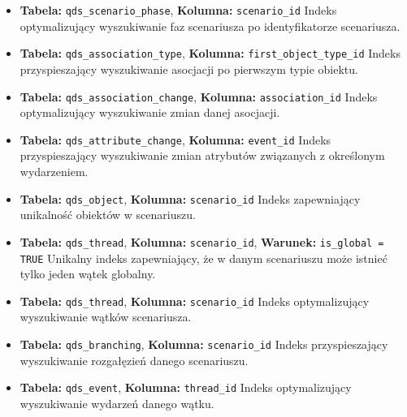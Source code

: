 \begin{itemize}
    \item \textbf{Tabela:} \texttt{qds\_scenario\_phase}, \textbf{Kolumna:} \texttt{scenario\_id}  
    Indeks optymalizujący wyszukiwanie faz scenariusza po identyfikatorze scenariusza.

    \item \textbf{Tabela:} \texttt{qds\_association\_type}, \textbf{Kolumna:} \texttt{first\_object\_type\_id}  
    Indeks przyspieszający wyszukiwanie asocjacji po pierwszym typie obiektu.

    \item \textbf{Tabela:} \texttt{qds\_association\_change}, \textbf{Kolumna:} \texttt{association\_id}  
    Indeks optymalizujący wyszukiwanie zmian danej asocjacji.

    \item \textbf{Tabela:} \texttt{qds\_attribute\_change}, \textbf{Kolumna:} \texttt{event\_id}  
    Indeks przyspieszający wyszukiwanie zmian atrybutów związanych z określonym wydarzeniem.

    \item \textbf{Tabela:} \texttt{qds\_object}, \textbf{Kolumna:} \texttt{scenario\_id}  
    Indeks zapewniający unikalność obiektów w scenariuszu.

    \item \textbf{Tabela:} \texttt{qds\_thread}, \textbf{Kolumna:} \texttt{scenario\_id}, \textbf{Warunek:} \texttt{is\_global = TRUE}  
    Unikalny indeks zapewniający, że w danym scenariuszu może istnieć tylko jeden wątek globalny.

    \item \textbf{Tabela:} \texttt{qds\_thread}, \textbf{Kolumna:} \texttt{scenario\_id}  
    Indeks optymalizujący wyszukiwanie wątków scenariusza.

    \item \textbf{Tabela:} \texttt{qds\_branching}, \textbf{Kolumna:} \texttt{scenario\_id}  
    Indeks przyspieszający wyszukiwanie rozgałęzień danego scenariuszu.

    \item \textbf{Tabela:} \texttt{qds\_event}, \textbf{Kolumna:} \texttt{thread\_id}  
    Indeks optymalizujący wyszukiwanie wydarzeń danego wątku.
\end{itemize}



















